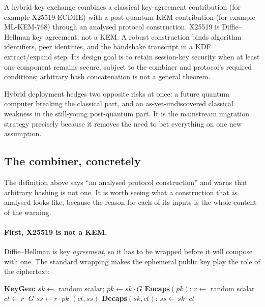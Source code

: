 \begin{definition}
A hybrid key exchange combines a classical key-agreement contribution (for example
X25519 ECDHE) with a post-quantum KEM contribution (for example ML-KEM-768) through
an analysed protocol construction. X25519 is Diffie--Hellman key agreement, not a
KEM. A robust construction binds algorithm identifiers, peer identities, and the
handshake transcript in a KDF extract/expand step. Its design goal is to retain
session-key security when at least one component remains secure, subject to the
combiner and protocol's required conditions; arbitrary hash concatenation is not a
general theorem.
\end{definition}

Hybrid deployment hedges two opposite risks at once: a future quantum computer breaking the classical part, and an as-yet-undiscovered classical weakness in the still-young post-quantum part. It is the mainstream migration strategy precisely because it removes the need to bet everything on one new assumption.

\subsection{The combiner, concretely}
\label{sec:kem-combiner}

The definition above says ``an analysed protocol construction'' and warns that
arbitrary hashing is not one. It is worth seeing what a construction that
\emph{is} analysed looks like, because the reason for each of its inputs is the
whole content of the warning.

\paragraph{First, X25519 is not a KEM.}
Diffie--Hellman is key \emph{agreement}, so it has to be wrapped before it will
compose with one. The standard wrapping makes the ephemeral public key play the
role of the ciphertext:

\begin{algorithm}[H]
\caption{A KEM from Diffie--Hellman (here X25519~\cite{rfc7748})}
\begin{algorithmic}[1]
\Statex \textbf{KeyGen:}
\State $sk \gets$ random scalar; \quad $pk \gets sk\cdot G$
\Statex \textbf{Encaps}$(pk)$:
\State $r \gets$ random scalar
\State $ct \gets r\cdot G$ 
\State $ss \gets r\cdot pk$ 
\State \Return $(ct, ss)$
\Statex \textbf{Decaps}$(sk, ct)$:
\State \Return $ss \gets sk\cdot ct$ 
\end{algorithmic}
\end{algorithm}

